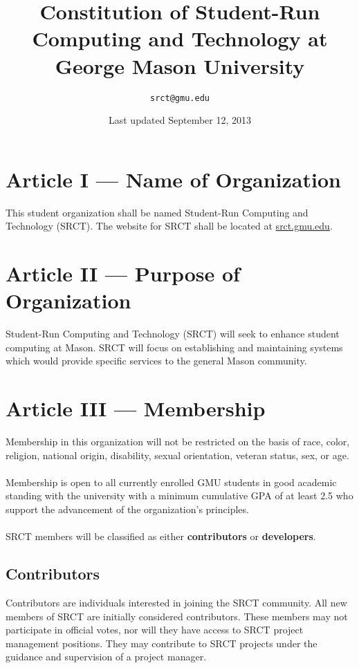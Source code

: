 \documentclass{article}
\title{\bfseries Constitution of Student-Run Computing and Technology at 
George Mason University}
\date{Last updated September 12, 2013}
\author{\texttt{srct@gmu.edu}}
\begin{document}
  
  \maketitle
  
  \section{Article I --- Name of Organization}
  This student organization shall be named Student-Run Computing and 
  Technology (SRCT). The website for SRCT shall be located at 
  \url{srct.gmu.edu}.
  
  \section{Article II --- Purpose of Organization}
  Student-Run Computing and Technology (SRCT) will seek to enhance 
  student computing at Mason. SRCT will focus on establishing and 
  maintaining systems which would provide specific services to the 
  general Mason community.
  
  \section{Article III --- Membership}
  Membership in this organization will not be restricted on the basis of 
  race, color, religion, national origin, disability, sexual 
  orientation, veteran status, sex, or age. 
  \\ \\
  Membership is open to all currently enrolled GMU students in good 
  academic standing with the university with a minimum cumulative GPA of 
  at least 2.5 who support the advancement of the organization's 
  principles.
  \\ \\
  SRCT members will be classified as either \textbf{contributors} or 
  \textbf{developers}.
  
  \subsection{Contributors}
  Contributors are individuals interested in joining the SRCT community. 
  All new members of SRCT are initially considered contributors. These 
  members may not participate in official votes, nor will they have 
  access to SRCT project management positions. They may contribute to 
  SRCT projects under the guidance and supervision of a project 
  manager.
  
\end{document}
